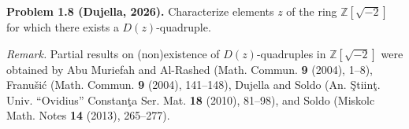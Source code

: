 \textbf{Problem 1.8 (Dujella, 2026).} Characterize elements $z$ of the ring $\mathbb{Z}[\sqrt{-2}]$ for which there exists a $D(z)$-quadruple.

\medskip

\textit{Remark.} Partial results on (non)existence of $D(z)$-quadruples in $\mathbb{Z}[\sqrt{-2}]$ were obtained by Abu Muriefah and Al-Rashed (Math. Commun. \textbf{9} (2004), 1--8), Franušić (Math. Commun. \textbf{9} (2004), 141--148), Dujella and Soldo (An. Ştiinţ. Univ. ``Ovidius'' Constanţa Ser. Mat. \textbf{18} (2010), 81--98), and Soldo (Miskolc Math. Notes \textbf{14} (2013), 265--277).
